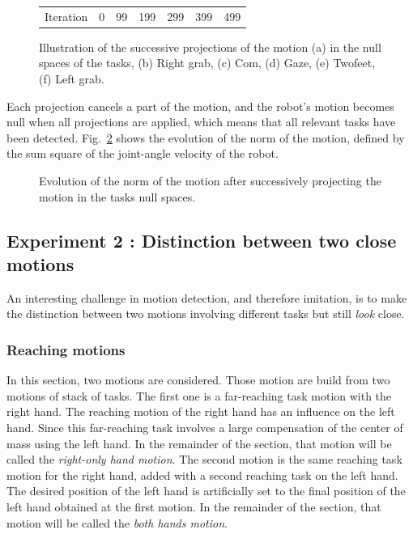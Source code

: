 \documentclass[letterpaper, 10pt, conference]{ieeeconf}      %
\begin{document}
\begin{figure}[t]
\begin{tabular}{c@{}c@{}c@{}c@{}c@{}c@{}c}
\\
Iteration & 0 & 99 & 199 & 299 & 399 & 499\\
\end{tabular}
\caption{Illustration of the successive projections of the motion (a) in the null spaces of the tasks,
(b) Right grab, (c) Com, (d) Gaze, (e) Twofeet, (f) Left grab.}
\label{fig:snapshotXpqdot}
\end{figure}
Each projection cancels a part of the motion, and the robot's motion becomes null when all
projections are applied,
which means that all relevant tasks have been detected.
Fig.~\ref{fig:xp3Pqdot} shows the evolution of the norm of the motion,
defined by the sum square of the joint-angle velocity of the robot.
\begin{figure}[t]
\begin{center}
\resizebox{.48\textwidth}{!} {
      
    }
\end{center}
\caption{Evolution of the norm of the motion after successively projecting the motion in the
	tasks null spaces.}
\label{fig:xp3Pqdot}
\end{figure}

\subsection{Experiment 2 : Distinction between two close motions}
\label{sec:distinc}
An interesting challenge in motion detection, and therefore imitation,
is to make the distinction between two motions
involving different tasks but still \emph{look} close.

\subsubsection{Reaching motions}
\label{sec:distinc1}
In this section, two motions are considered. Those motion are build from two motions of stack of tasks.
The first one is a far-reaching task motion with the right hand.
The reaching motion of the right hand has an influence on the left hand.
Since this far-reaching task involves a large compensation of the center of mass
using the left hand.
In the remainder of the section, that motion will be called the
\emph{right-only hand motion}.
The second motion is the same reaching task motion for the right hand, added with a
second reaching task on the left hand. The desired position of the left
hand is artificially set to the final position of the left hand obtained at the first motion.
In the remainder of the section, that motion will be called the
\emph{both hands motion}.
\end{document}

